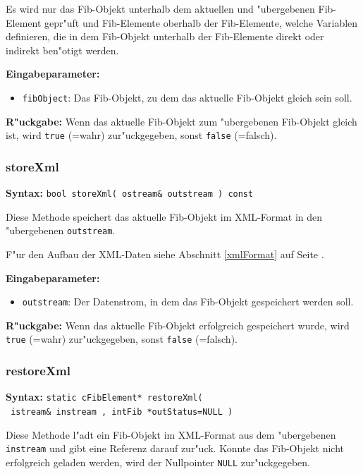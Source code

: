 Es wird nur das Fib-Objekt unterhalb dem aktuellen und "ubergebenen Fib-Element gepr"uft und Fib-Elemente oberhalb der Fib-Elemente, welche Variablen definieren, die in dem Fib-Objekt unterhalb der Fib-Elemente direkt oder indirekt ben"otigt werden.

\bigskip\noindent
\textbf{Eingabeparameter:}
\begin{itemize}
 \item \verb|fibObject|: Das Fib-Objekt, zu dem das aktuelle Fib-Objekt gleich sein soll.
\end{itemize}

\bigskip\noindent
\textbf{R"uckgabe:} Wenn das aktuelle Fib-Objekt zum "ubergebenen Fib-Objekt gleich ist, wird \verb|true| (=wahr) zur"uckgegeben, sonst \verb|false| (=falsch).


\subsubsection{storeXml}

\textbf{Syntax:} \verb|bool storeXml( ostream& outstream ) const|

\bigskip\noindent
Diese Methode speichert das aktuelle Fib-Objekt im XML-Format in den "ubergebenen \verb|outstream|.

F"ur den Aufbau der XML-Daten siehe Abschnitt \ref{xmlFormat} auf Seite \pageref{xmlFormat}.

\bigskip\noindent
\textbf{Eingabeparameter:}
\begin{itemize}
 \item \verb|outstream|: Der Datenstrom, in dem das Fib-Objekt gespeichert werden soll.
\end{itemize}

\bigskip\noindent
\textbf{R"uckgabe:} Wenn das aktuelle Fib-Objekt erfolgreich gespeichert wurde, wird \verb|true| (=wahr) zur"uckgegeben, sonst \verb|false| (=falsch).


\subsubsection{restoreXml}

\textbf{Syntax:} \verb|static cFibElement* restoreXml( | \\\verb| istream& instream , intFib *outStatus=NULL )|

\bigskip\noindent
Diese Methode l"adt ein Fib-Objekt im XML-Format aus dem "ubergebenen \verb|instream| und gibt eine Referenz darauf zur"uck. Konnte das Fib-Objekt nicht erfolgreich geladen werden, wird der Nullpointer \verb|NULL| zur"uckgegeben.

